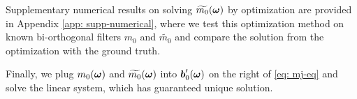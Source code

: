 Supplementary numerical results on solving $\widetilde{m_{0}}(\boldsymbol{\omega})$ by optimization are provided in Appendix \ref{app: supp-numerical}, where we test this optimization method on known bi-orthogonal filters $m_0$ and $\widetilde{m_0}$ and compare the solution from the optimization with the ground truth.

Finally, we plug $m_0(\boldsymbol{\omega})$ and $\widetilde{m_{0}}(\boldsymbol{\omega})$ into $\boldsymbol{b}_0'(\boldsymbol{\omega})$ on the right of \eqref{eq: mj-eq} and solve the linear system, which has guaranteed unique solution.

